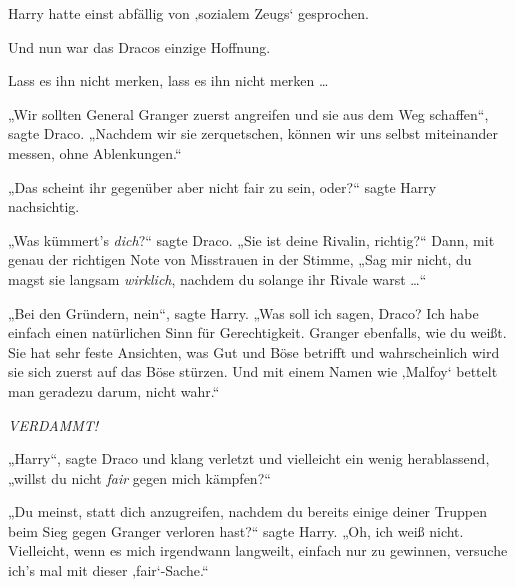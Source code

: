 Harry hatte einst abfällig von ‚sozialem Zeugs‘ gesprochen.

Und nun war das Dracos einzige Hoffnung.

Lass es ihn nicht merken, lass es ihn nicht merken …

„Wir sollten General Granger zuerst angreifen und sie aus dem Weg schaffen“, sagte Draco.
„Nachdem wir sie zerquetschen, können wir uns selbst miteinander messen, ohne Ablenkungen.“

„Das scheint ihr gegenüber aber nicht fair zu sein, oder?“ sagte Harry nachsichtig.

„Was kümmert’s \emph{dich}?“ sagte Draco.
„Sie ist deine Rivalin, richtig?“ Dann, mit genau der richtigen Note von Misstrauen in der Stimme,
„Sag mir nicht, du magst sie langsam \emph{wirklich}, nachdem du solange ihr Rivale warst …“

„Bei den Gründern, nein“, sagte Harry.
„Was soll ich sagen, Draco? Ich habe einfach einen natürlichen Sinn für Gerechtigkeit. Granger ebenfalls, wie du weißt. Sie hat sehr feste Ansichten, was Gut und Böse betrifft und wahrscheinlich wird sie sich zuerst auf das Böse stürzen. Und mit einem Namen wie ‚Malfoy‘ bettelt man geradezu darum, nicht wahr.“

\emph{VERDAMMT!}

„Harry“, sagte Draco und klang verletzt und vielleicht ein wenig herablassend, „willst du nicht \emph{fair} gegen mich kämpfen?“

„Du meinst, statt dich anzugreifen, nachdem du bereits einige deiner Truppen beim Sieg gegen Granger verloren hast?“ sagte Harry.
„Oh, ich weiß nicht. Vielleicht, wenn es mich irgendwann langweilt, einfach nur zu gewinnen, versuche ich’s mal mit dieser ‚fair‘-Sache.“

